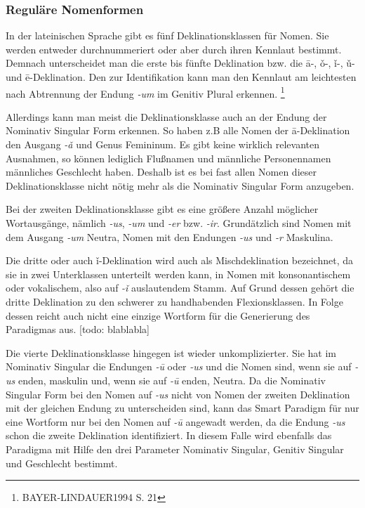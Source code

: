\documentclass[12pt,abstract=on,titlepage,bibliography=totoc,ngerman,listof=totoc]{scrreprt}
\begin{document}
\subsubsection{Reguläre Nomenformen}
In der lateinischen Sprache gibt es fünf Deklinationsklassen für Nomen. Sie werden entweder durchnummeriert oder aber durch ihren Kennlaut bestimmt. Demnach unterscheidet man die erste bis fünfte Deklination bzw. die ā-, ǒ-, ǐ-, ǔ- und ē-Deklination. Den zur Identifikation kann man den Kennlaut am leichtesten nach Abtrennung der Endung \textit{-um} im Genitiv Plural erkennen. \footnote{BAYER-LINDAUER1994 S. 21}\par
Allerdings kann man meist die Deklinationsklasse auch an der Endung der Nominativ Singular Form erkennen. So haben z.B alle Nomen der ā-Deklination den Ausgang \textit{-ǎ} und Genus Femininum. Es gibt keine wirklich relevanten Ausnahmen, so können lediglich Flußnamen und männliche Personennamen männliches Geschlecht haben. Deshalb ist es bei fast allen Nomen dieser Deklinationsklasse nicht nötig mehr als die Nominativ Singular Form anzugeben. \par
Bei der zweiten Deklinationsklasse gibt es eine größere Anzahl möglicher Wortausgänge, nämlich \textit{-us}, \textit{-um} und \textit{-er} bzw. \textit{-ir}. Grundätzlich sind Nomen mit dem Ausgang \textit{-um} Neutra, Nomen mit den Endungen \textit{-us} und \textit{-r} Maskulina. \par
Die dritte oder auch ǐ-Deklination wird auch als Mischdeklination bezeichnet, da sie in zwei Unterklassen unterteilt werden kann, in Nomen mit konsonantischem oder vokalischem, also auf \textit{-ǐ} auslautendem Stamm. Auf Grund dessen gehört die dritte Deklination zu den schwerer zu handhabenden Flexionsklassen. In Folge dessen reicht auch nicht eine einzige Wortform für die Generierung des Paradigmas aus. [todo: blablabla] \par
Die vierte Deklinationsklasse hingegen ist wieder unkomplizierter. Sie hat im Nominativ Singular die Endungen \textit{-ū} oder \textit{-us} und die Nomen sind, wenn sie auf \textit{-us} enden, maskulin und, wenn sie auf \textit{-ū} enden, Neutra. Da die Nominativ Singular Form bei den Nomen auf \textit{-us} nicht von Nomen der zweiten Deklination mit der gleichen Endung zu unterscheiden sind, kann das Smart Paradigm für nur eine Wortform nur bei den Nomen auf \textit{-ū} angewadt werden, da die Endung \textit{-us} schon die zweite Deklination identifiziert. In diesem Falle wird ebenfalls das Paradigma mit Hilfe den drei Parameter Nominativ Singular, Genitiv Singular und Geschlecht bestimmt. \par
\end{document}
